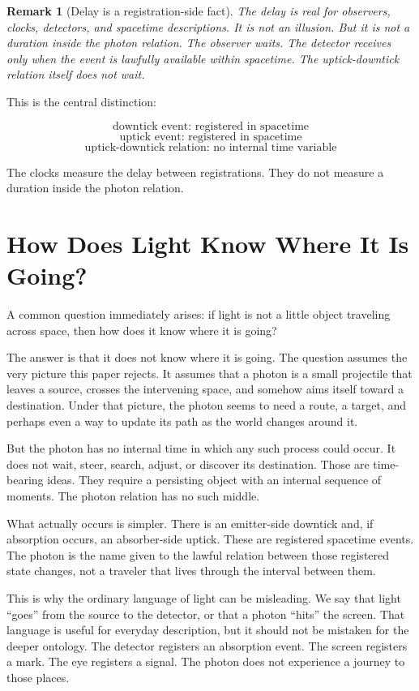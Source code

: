 \documentclass[12pt,onecolumn]{article}
\newtheorem{remark}{Remark}
\begin{document}
\begin{remark}[Delay is a registration-side fact]
The delay is real for observers, clocks, detectors, and spacetime descriptions. It is not an illusion. But it is not a duration inside the photon relation. The observer waits. The detector receives only when the event is lawfully available within spacetime. The uptick-downtick relation itself does not wait.
\end{remark}

This is the central distinction:

\[
\text{downtick event: registered in spacetime}
\]
\[
\text{uptick event: registered in spacetime}
\]
\[
\text{uptick-downtick relation: no internal time variable}
\]

The clocks measure the delay between registrations. They do not measure a duration inside the photon relation.

\section{How Does Light Know Where It Is Going?}

A common question immediately arises: if light is not a little object traveling across space, then how does it know where it is going?

The answer is that it does not know where it is going. The question assumes the very picture this paper rejects. It assumes that a photon is a small projectile that leaves a source, crosses the intervening space, and somehow aims itself toward a destination. Under that picture, the photon seems to need a route, a target, and perhaps even a way to update its path as the world changes around it.

But the photon has no internal time in which any such process could occur. It does not wait, steer, search, adjust, or discover its destination. Those are time-bearing ideas. They require a persisting object with an internal sequence of moments. The photon relation has no such middle.

What actually occurs is simpler. There is an emitter-side downtick and, if absorption occurs, an absorber-side uptick. These are registered spacetime events. The photon is the name given to the lawful relation between those registered state changes, not a traveler that lives through the interval between them.

This is why the ordinary language of light can be misleading. We say that light ``goes'' from the source to the detector, or that a photon ``hits'' the screen. That language is useful for everyday description, but it should not be mistaken for the deeper ontology. The detector registers an absorption event. The screen registers a mark. The eye registers a signal. The photon does not experience a journey to those places.
\end{document}
